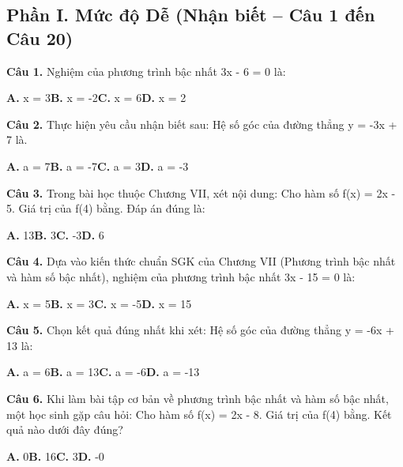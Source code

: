 \documentclass[11pt,a4paper]{article}
\begin{document}
\subsection*{\color{accent} Phần I. Mức độ Dễ (Nhận biết -- Câu 1 đến Câu 20)}
\textbf{\color{primary} Câu 1.} Nghiệm của phương trình bậc nhất 3x - 6 = 0 là:\par
\hspace*{1.5em}\textbf{A.} x = 3\quad\quad \textbf{B.} x = -2\quad\quad \textbf{C.} x = 6\quad\quad \textbf{D.} x = 2\par\vspace{2pt}
\textbf{\color{primary} Câu 2.} Thực hiện yêu cầu nhận biết sau: Hệ số góc của đường thẳng y = -3x + 7 là.\par
\hspace*{1.5em}\textbf{A.} a = 7\quad\quad \textbf{B.} a = -7\quad\quad \textbf{C.} a = 3\quad\quad \textbf{D.} a = -3\par\vspace{2pt}
\textbf{\color{primary} Câu 3.} Trong bài học thuộc Chương VII, xét nội dung: Cho hàm số f(x) = 2x - 5. Giá trị của f(4) bằng. Đáp án đúng là:\par
\hspace*{1.5em}\textbf{A.} 13\quad\quad \textbf{B.} 3\quad\quad \textbf{C.} -3\quad\quad \textbf{D.} 6\par\vspace{2pt}
\textbf{\color{primary} Câu 4.} Dựa vào kiến thức chuẩn SGK của Chương VII (Phương trình bậc nhất và hàm số bậc nhất), nghiệm của phương trình bậc nhất 3x - 15 = 0 là:\par
\hspace*{1.5em}\textbf{A.} x = 5\quad\quad \textbf{B.} x = 3\quad\quad \textbf{C.} x = -5\quad\quad \textbf{D.} x = 15\par\vspace{2pt}
\textbf{\color{primary} Câu 5.} Chọn kết quả đúng nhất khi xét: Hệ số góc của đường thẳng y = -6x + 13 là:\par
\hspace*{1.5em}\textbf{A.} a = 6\quad\quad \textbf{B.} a = 13\quad\quad \textbf{C.} a = -6\quad\quad \textbf{D.} a = -13\par\vspace{2pt}
\textbf{\color{primary} Câu 6.} Khi làm bài tập cơ bản về phương trình bậc nhất và hàm số bậc nhất, một học sinh gặp câu hỏi: Cho hàm số f(x) = 2x - 8. Giá trị của f(4) bằng. Kết quả nào dưới đây đúng?\par
\hspace*{1.5em}\textbf{A.} 0\quad\quad \textbf{B.} 16\quad\quad \textbf{C.} 3\quad\quad \textbf{D.} -0\par\vspace{2pt}
\end{document}
